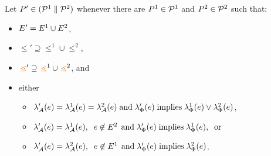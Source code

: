\begin{definition}
Let $P' \in (\mathcal{P}^1 \parallel \mathcal{P}^2)$
whenever there are $P^1 \in \mathcal{P}^1$ and $P^2 \in \mathcal{P}^2$ such that:
\begin{itemize}
\item $E' = E^1 \cup E^2$,
\item ${\le'}\supseteq{\le^1}\cup{\le^2}$, %
\item ${\gtN'}\supseteq{\gtN^1}\cup{\gtN^2}$, and %
\item either
  \begin{itemize}
  \item $\lambda_{\mathcal{A}}'(e) = \lambda_{\mathcal{A}}^1(e) = \lambda_{\mathcal{A}}^2(e)
    \;\allowbreak\text{and}\allowbreak\; \lambda_{\Phi}'(e) \; \allowbreak\text{implies}\allowbreak\; \lambda_{\Phi}^1(e) \lor \lambda_{\Phi}^2(e)$,
  \item $\lambda_{\mathcal{A}}'(e) = \lambda_{\mathcal{A}}^1(e),\;\; e \not\in E^2\,
    \;\allowbreak\text{and}\allowbreak\; \lambda_{\Phi}'(e) \; \allowbreak\text{implies}\allowbreak\; \lambda_{\Phi}^1(e),\; \; \allowbreak\text{or}\allowbreak\;$
  \item $\lambda_{\mathcal{A}}'(e) = \lambda_{\mathcal{A}}^2(e),\;\; e \not\in E^1\,
    \;\allowbreak\text{and}\allowbreak\; \lambda_{\Phi}'(e) \; \allowbreak\text{implies}\allowbreak\; \lambda_{\Phi}^2(e)$.
  \end{itemize}
\end{itemize}
\end{definition}
